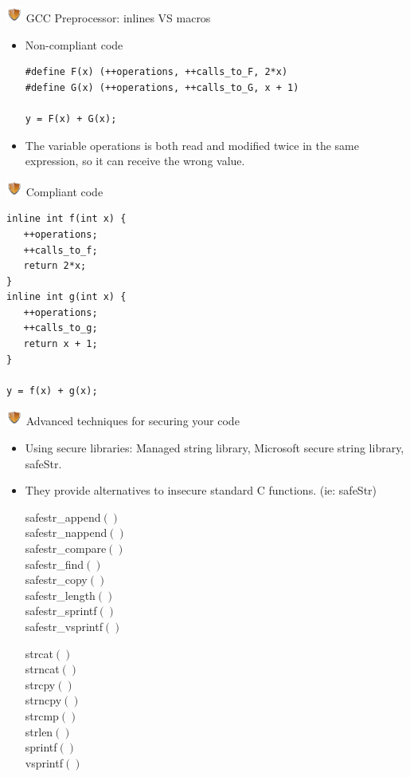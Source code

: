 \documentclass{beamer}
\newcommand{\shield}{\includegraphics[width=15pt]{shield.png} \hspace*{5pt}}
\begin{document}
\begin{frame}[fragile]{\shield GCC Preprocessor: inlines VS macros}
\begin{itemize}
\item Non-compliant code
  \begin{lstlisting}[style=cstyle]
#define F(x) (++operations, ++calls_to_F, 2*x)
#define G(x) (++operations, ++calls_to_G, x + 1)
 
y = F(x) + G(x);
  \end{lstlisting}
\pause
\item The variable operations is both read and modified twice in the same expression, so it can receive the wrong value.\\[0.1cm]
\end{itemize}
\end{frame}

\begin{frame}[fragile]{\shield Compliant code}

\begin{lstlisting}[style=cstyle]
inline int f(int x) {
   ++operations;
   ++calls_to_f;
   return 2*x;
}
inline int g(int x) {
   ++operations;
   ++calls_to_g;
   return x + 1;
}
 
y = f(x) + g(x);
\end{lstlisting}
\end{frame}
\begin{frame}{\shield Advanced techniques for securing your code}
\begin{itemize}
\item Using secure libraries: Managed string library, Microsoft secure string library, safeStr.
\pause
\item They provide alternatives to insecure standard C functions. (ie: safeStr)
{\scriptsize
\begin{center}
\begin{minipage}{3cm}
safestr\_append$()$\\
safestr\_nappend$()$\\
safestr\_compare$()$\\
safestr\_find$()$\\
safestr\_copy$()$\\
safestr\_length$()$\\
safestr\_sprintf$()$\\
safestr\_vsprintf$()$
\end{minipage}
\begin{minipage}{3cm}
strcat$()$ \\
strncat$()$ \\
strcpy$()$ \\
strncpy$()$ \\
strcmp$()$ \\
strlen$()$ \\
sprintf$()$ \\
vsprintf$()$ \\
\end{minipage}
\end{center}
}
\end{itemize}
\end{frame}
\end{document}
